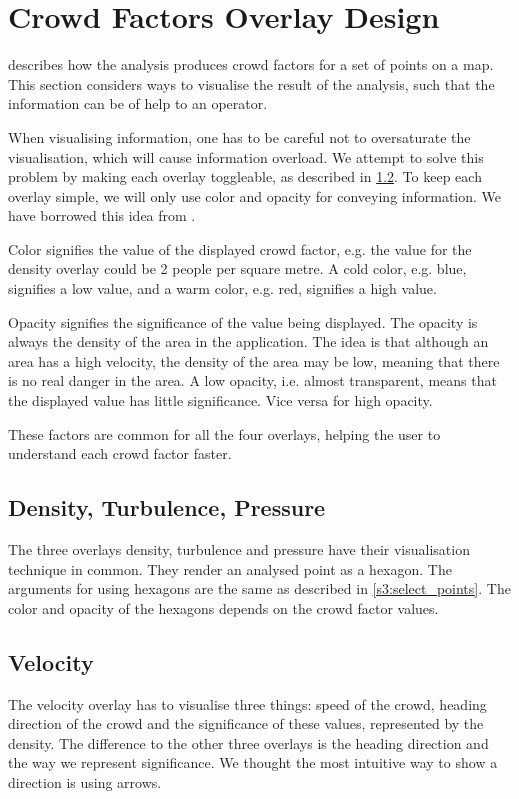 \section{Crowd Factors Overlay Design} \label{sec:s4_overlay}

 describes how the analysis produces crowd factors for a set of points on a map. This section considers ways to visualise the result of the analysis, such that the information can be of help to an operator.

When visualising information, one has to be careful not to oversaturate the visualisation, which will cause information overload. We attempt to solve this problem by making each overlay toggleable, as described in \cref{}. To keep each overlay simple, we will only use color and opacity for conveying information. We have borrowed this idea from \citep{}.

Color signifies the value of the displayed crowd factor, e.g. the value for the density overlay could be 2 people per square metre. A cold color, e.g. blue, signifies a low value, and a warm color, e.g. red, signifies a high value. 

Opacity signifies the significance of the value being displayed. The opacity is always the density of the area in the application. The idea is that although an area has a high velocity, the density of the area may be low, meaning that there is no real danger in the area. A low opacity, i.e. almost transparent, means that the displayed value has little significance. Vice versa for high opacity. 

These factors are common for all the four overlays, helping the user to understand each crowd factor faster.

\subsection{Density, Turbulence, Pressure}
The three overlays density, turbulence and pressure have their visualisation technique in common. They render an analysed point as a hexagon. The arguments for using hexagons are the same as described in \cref{s3:select_points}. The color and opacity of the hexagons depends on the crowd factor values.

\subsection{Velocity}
The velocity overlay has to visualise three things: speed of the crowd, heading direction of the crowd and the significance of these values, represented by the density. The difference to the other three overlays is the heading direction and the way we represent significance. We thought the most intuitive way to show a direction is using arrows. 

